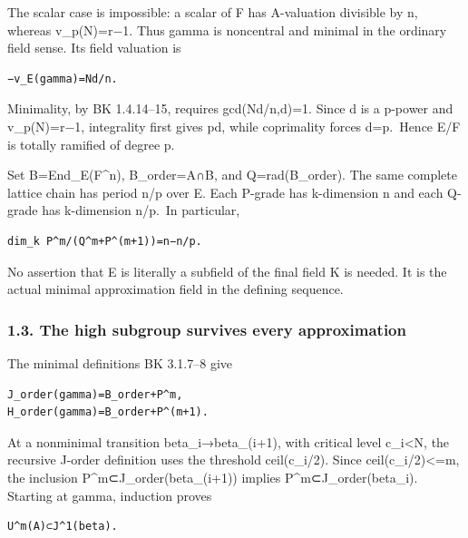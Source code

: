The scalar case is impossible: a scalar of F has A-valuation divisible
by n, whereas v\_p(N)=r−1. Thus gamma is noncentral and minimal in the
ordinary field sense. Its field valuation is

\begin{Verbatim}[fontsize=\small,breaklines=true,breakanywhere=true]
−v_E(gamma)=Nd/n.
\end{Verbatim}

Minimality, by BK 1.4.14--15, requires gcd(Nd/n,d)=1. Since d is a
p-power and v\_p(N)=r−1, integrality first gives p\textbar d, while
coprimality forces d=p.~Hence E/F is totally ramified of degree p.

Set B=End\_E(F\^{}n), B\_order=A∩B, and Q=rad(B\_order). The same
complete lattice chain has period n/p over E. Each P-grade has
k-dimension n and each Q-grade has k-dimension n/p.~In particular,

\begin{Verbatim}[fontsize=\small,breaklines=true,breakanywhere=true]
dim_k P^m/(Q^m+P^(m+1))=n−n/p.
\end{Verbatim}

No assertion that E is literally a subfield of the final field K is
needed. It is the actual minimal approximation field in the defining
sequence.

\hypertarget{odd_capacity-the-high-subgroup-survives-every-approximation}{%
\subsubsection{1.3. The high subgroup survives every
approximation}\label{odd_capacity-the-high-subgroup-survives-every-approximation}}

The minimal definitions BK 3.1.7--8 give

\begin{Verbatim}[fontsize=\small,breaklines=true,breakanywhere=true]
J_order(gamma)=B_order+P^m,
H_order(gamma)=B_order+P^(m+1).
\end{Verbatim}

At a nonminimal transition beta\_i→beta\_(i+1), with critical level
c\_i\textless N, the recursive J-order definition uses the threshold
ceil(c\_i/2). Since ceil(c\_i/2)\textless=m, the inclusion
P\^{}m⊂J\_order(beta\_(i+1)) implies P\^{}m⊂J\_order(beta\_i). Starting
at gamma, induction proves

\begin{Verbatim}[fontsize=\small,breaklines=true,breakanywhere=true]
U^m(A)⊂J^1(beta).
\end{Verbatim}

